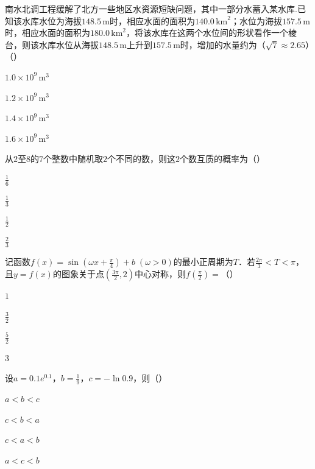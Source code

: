 \documentclass[fontset=founder]{ucedubook}
\begin{document}
\begin{ti}
南水北调工程缓解了北方一些地区水资源短缺问题，其中一部分水蓄入某水库.已知该水库水位为海拔$148.5\,\mathrm{m}$时，相应水面的面积为$140.0\,\mathrm{{km}^{2}}$；水位为海拔$157.5\,\mathrm{m}$时，相应水面的面积为$180.0\,\mathrm{{km}^{2}}$，将该水库在这两个水位间的形状看作一个棱台，则该水库水位从海拔$148.5\,\mathrm{m}$上升到$157.5\,\mathrm{m}$时，增加的水量约为（$\sqrt{7} \approx 2.65$）（\qquad）

\begin{choices}
  \item $1.0 \times 10^{9}\,\mathrm{{m}^{3}}$
  \item $1.2 \times 10^{9}\,\mathrm{{m}^{3}}$
  \item $1.4 \times 10^{9}\,\mathrm{{m}^{3}}$
  \item $1.6 \times 10^{9}\,\mathrm{{m}^{3}}$
\end{choices}
\end{ti}


\begin{ti}
从$2$至$8$的$7$个整数中随机取$2$个不同的数，则这$2$个数互质的概率为（\qquad）

\begin{choices}
  \item $\frac{1}{6}$
  \item $\frac{1}{3}$
  \item $\frac{1}{2}$
  \item $\frac{2}{3}$
\end{choices}
\end{ti}


\begin{ti}
记函数$f(x) = \sin\left(\omega x + \frac{\pi}{4}\right) + b\;(\omega > 0)$的最小正周期为$T$．若$\frac{2\pi}{3} < T < \pi$，且$y = f(x)$的图象关于点$\left(\frac{3\pi}{2},2\right)$中心对称，则$f\left(\frac{\pi}{2}\right) =$（\qquad）

\begin{choices}
  \item $1$
  \item $\frac{3}{2}$
  \item $\frac{5}{2}$
  \item $3$
\end{choices}
\end{ti}


\begin{ti}
设$a = 0.1e^{0.1}$，$b = \frac{1}{9}$，$c = - \ln 0.9$，则（\qquad）

\begin{choices}
  \item $a < b < c$
  \item $c < b < a$
  \item $c < a < b$
  \item $a < c < b$
\end{choices}
\end{ti}
\end{document}
